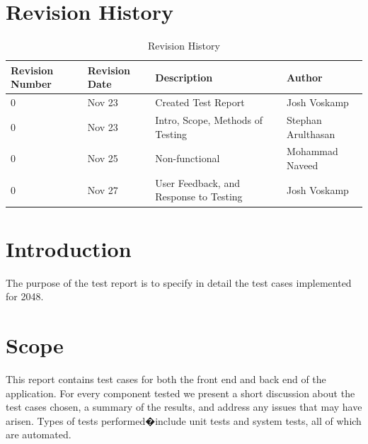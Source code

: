 \documentclass[12pt]{article}
\begin{document}
\begin{titlepage}



\vfill %

\end{titlepage}

\newpage
\tableofcontents
\newpage
\listoftables
{}
\newpage
\listoffigures
{}
\newpage

\section*{Revision History}
\begin{table}[H]
	\centering
    \begin{tabular}{ | p{2cm} |  p{2cm} | p{5cm} | p{3.8cm} |}
    \hline
    Revision Number & Revision Date & Description & Author \\ \hline
    0 & Nov 23 & Created Test Report & Josh Voskamp \\ \hline
	0 & Nov 23 & Intro, Scope, Methods of Testing & Stephan Arulthasan\\ \hline
	0 & Nov 25 & Non-functional & Mohammad Naveed \\ \hline
	0 & Nov 27 & User Feedback, and Response to Testing & Josh Voskamp \\ \hline
    \end{tabular}
    \caption{Revision History}
\end{table}

\newpage

\section{Introduction}
The purpose of the test report is to specify in detail the test cases implemented for 2048.

\section{Scope}
This report contains test cases for both the front end and back end of the application. For every component tested we present a short discussion about the test cases chosen, a summary of the results, and address any issues that may have arisen. Types of tests performed�include unit tests and system tests, all of which are automated.
\end{document}
